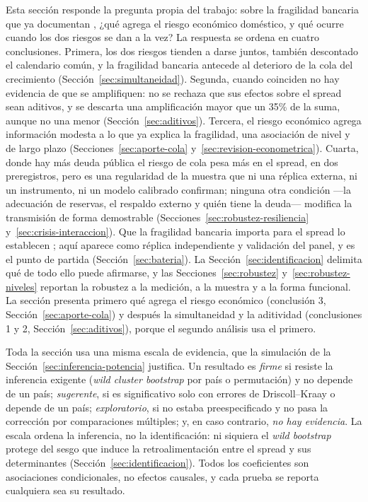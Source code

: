Esta sección responde la pregunta propia del trabajo: sobre la fragilidad bancaria que ya documentan \citet{Chari2024b}, ¿qué agrega el riesgo económico doméstico, y qué ocurre cuando los dos riesgos se dan a la vez? La respuesta se ordena en cuatro conclusiones. Primera, los dos riesgos tienden a darse juntos, también descontado el calendario común, y la fragilidad bancaria antecede al deterioro de la cola del crecimiento (Sección~\ref{sec:simultaneidad}). Segunda, cuando coinciden no hay evidencia de que se amplifiquen: no se rechaza que sus efectos sobre el spread sean aditivos, y se descarta una amplificación mayor que un 35\% de la suma, aunque no una menor (Sección~\ref{sec:aditivos}). Tercera, el riesgo económico agrega información modesta a lo que ya explica la fragilidad, una asociación de nivel y de largo plazo (Secciones~\ref{sec:aporte-cola} y~\ref{sec:revision-econometrica}). Cuarta, donde hay más deuda pública el riesgo de cola pesa más en el spread, en dos preregistros, pero es una regularidad de la muestra que ni una réplica externa, ni un instrumento, ni un modelo calibrado confirman; ninguna otra condición ---la adecuación de reservas, el respaldo externo y quién tiene la deuda--- modifica la transmisión de forma demostrable (Secciones~\ref{sec:robustez-resiliencia} y~\ref{sec:crisis-interaccion}). Que la fragilidad bancaria importa para el spread lo establecen \citet{Chari2024b}; aquí aparece como réplica independiente y validación del panel, y es el punto de partida (Sección~\ref{sec:bateria}). La Sección~\ref{sec:identificacion} delimita qué de todo ello puede afirmarse, y las Secciones~\ref{sec:robustez} y~\ref{sec:robustez-niveles} reportan la robustez a la medición, a la muestra y a la forma funcional. La sección presenta primero qué agrega el riesgo económico (conclusión 3, Sección~\ref{sec:aporte-cola}) y después la simultaneidad y la aditividad (conclusiones 1 y 2, Sección~\ref{sec:aditivos}), porque el segundo análisis usa el primero.

Toda la sección usa una misma escala de evidencia, que la simulación de la Sección~\ref{sec:inferencia-potencia} justifica. Un resultado es \emph{firme} si resiste la inferencia exigente (\textit{wild cluster bootstrap} por país o permutación) y no depende de un país; \emph{sugerente}, si es significativo solo con errores de Driscoll--Kraay o depende de un país; \emph{exploratorio}, si no estaba preespecificado y no pasa la corrección por comparaciones múltiples; y, en caso contrario, \emph{no hay evidencia}. La escala ordena la inferencia, no la identificación: ni siquiera el \textit{wild bootstrap} protege del sesgo que induce la retroalimentación entre el spread y sus determinantes (Sección~\ref{sec:identificacion}). Todos los coeficientes son asociaciones condicionales, no efectos causales, y cada prueba se reporta cualquiera sea su resultado.

